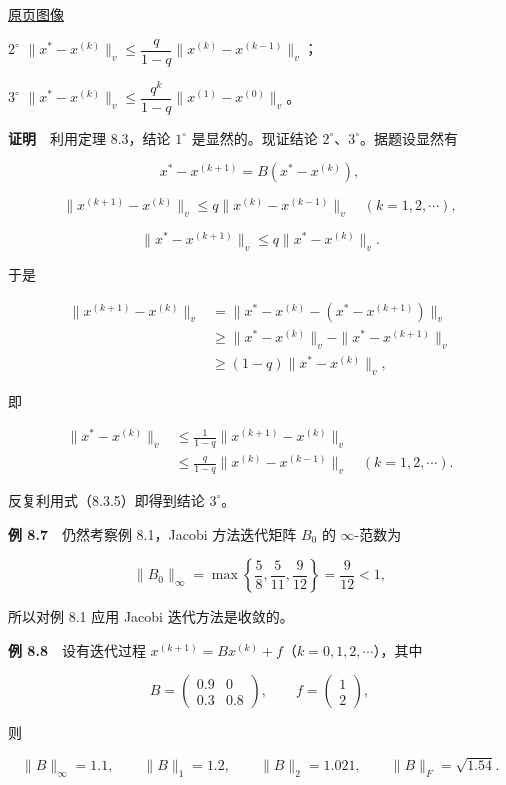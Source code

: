 \href{source-images/pdf-223.jpeg}{原页图像}

\(2^\circ\) \(\|x^*-x^{(k)}\|_v\leqslant\dfrac{q}{1-q}\|x^{(k)}-x^{(k-1)}\|_v\)；

\(3^\circ\) \(\|x^*-x^{(k)}\|_v\leqslant\dfrac{q^k}{1-q}\|x^{(1)}-x^{(0)}\|_v\)。

\textbf{证明}　利用定理 8.3，结论 \(1^\circ\) 是显然的。现证结论 \(2^\circ\)、\(3^\circ\)。据题设显然有

\[
x^*-x^{(k+1)}=B(x^*-x^{(k)}),
\tag{8.3.4}
\]

\[
\|x^{(k+1)}-x^{(k)}\|_v\leqslant q\|x^{(k)}-x^{(k-1)}\|_v\quad(k=1,2,\cdots),
\tag{8.3.5}
\]

\[
\|x^*-x^{(k+1)}\|_v\leqslant q\|x^*-x^{(k)}\|_v.
\tag{8.3.6}
\]

于是

\[
\begin{aligned}
\|x^{(k+1)}-x^{(k)}\|_v
&=\|x^*-x^{(k)}-(x^*-x^{(k+1)})\|_v\\
&\geqslant\|x^*-x^{(k)}\|_v-\|x^*-x^{(k+1)}\|_v\\
&\geqslant(1-q)\|x^*-x^{(k)}\|_v,
\end{aligned}
\]

即

\[
\begin{aligned}
\|x^*-x^{(k)}\|_v
&\leqslant\frac1{1-q}\|x^{(k+1)}-x^{(k)}\|_v\\
&\leqslant\frac{q}{1-q}\|x^{(k)}-x^{(k-1)}\|_v\quad(k=1,2,\cdots).
\end{aligned}
\]

反复利用式（8.3.5）即得到结论 \(3^\circ\)。

\textbf{例 8.7}　仍然考察例 8.1，Jacobi 方法迭代矩阵 \(B_0\) 的 \(\infty\)-范数为

\[
\|B_0\|_\infty=\max\left\{\frac58,\frac5{11},\frac9{12}\right\}=\frac9{12}<1,
\]

所以对例 8.1 应用 Jacobi 迭代方法是收敛的。

\textbf{例 8.8}　设有迭代过程 \(x^{(k+1)}=Bx^{(k)}+f\)（\(k=0,1,2,\cdots\)），其中

\[
B=\begin{pmatrix}0.9&0\\0.3&0.8\end{pmatrix},\qquad f=\begin{pmatrix}1\\2\end{pmatrix},
\]

则

\[
\|B\|_\infty=1.1,\qquad\|B\|_1=1.2,\qquad\|B\|_2=1.021,\qquad\|B\|_F=\sqrt{1.54}.
\]

